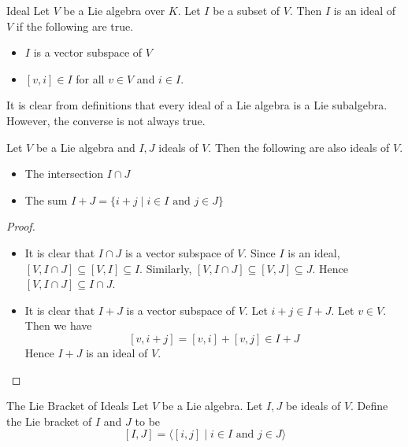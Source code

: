 \documentclass[a4paper]{article}
\begin{document}
\begin{defn}{Ideal}{} Let $V$ be a Lie algebra over $K$. Let $I$ be a subset of $V$. Then $I$ is an ideal of $V$ if the following are true. 
\begin{itemize}
\item $I$ is a vector subspace of $V$
\item $[v,i]\in I$ for all $v\in V$ and $i\in I$. 
\end{itemize}
\end{defn}

It is clear from definitions that every ideal of a Lie algebra is a Lie subalgebra. However, the converse is not always true. 

\begin{prp}{}{} Let $V$ be a Lie algebra and $I,J$ ideals of $V$. Then the following are also ideals of $V$. 
\begin{itemize}
\item The intersection $I\cap J$
\item The sum $I+J=\{i+j\;|\;i\in I\text{ and }j\in J\}$
\end{itemize} \tcbline
\begin{proof}~\\
\begin{itemize}
\item It is clear that $I\cap J$ is a vector subspace of $V$. Since $I$ is an ideal, $[V,I\cap J]\subseteq [V,I]\subseteq I$. Similarly, $[V,I\cap J]\subseteq[V,J]\subseteq J$. Hence $[V,I\cap J]\subseteq I\cap J$. 
\item It is clear that $I+J$ is a vector subspace of $V$. Let $i+j\in I+J$. Let $v\in V$. Then we have $$[v,i+j]=[v,i]+[v,j]\in I+J$$ Hence $I+J$ is an ideal of $V$. 
\end{itemize}
\end{proof}
\end{prp}

\begin{defn}{The Lie Bracket of Ideals}{} Let $V$ be a Lie algebra. Let $I,J$ be ideals of $V$. Define the Lie bracket of $I$ and $J$ to be $$[I,J]=\langle[i,j]\;|\;i\in I\text{ and }j\in J\rangle$$
\end{defn}
\end{document}
